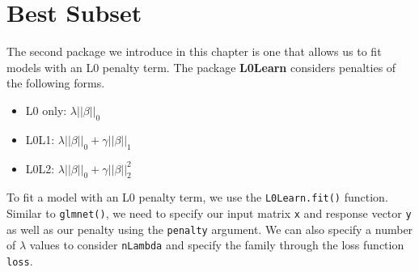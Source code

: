 \documentclass[
  letterpaper,
]{latex/krantz}
\makeatletter
\newenvironment{Shaded}{\begin{snugshade}}{\end{snugshade}}
\newcommand{\AttributeTok}[1]{\textcolor[rgb]{0.40,0.45,0.13}{#1}}
\newcommand{\CommentTok}[1]{\textcolor[rgb]{0.37,0.37,0.37}{#1}}
\newcommand{\DecValTok}[1]{\textcolor[rgb]{0.68,0.00,0.00}{#1}}
\newcommand{\FunctionTok}[1]{\textcolor[rgb]{0.28,0.35,0.67}{#1}}
\newcommand{\NormalTok}[1]{\textcolor[rgb]{0.00,0.23,0.31}{#1}}
\newcommand{\SpecialCharTok}[1]{\textcolor[rgb]{0.37,0.37,0.37}{#1}}
\newenvironment{kframe}{%
\medskip{}
\setlength{\fboxsep}{.8em}
 \def\at@end@of@kframe{}%
 \ifinner\ifhmode%
  \def\at@end@of@kframe{\end{minipage}}%
  \begin{minipage}{\columnwidth}%
 \fi\fi%
 \def\FrameCommand##1{\hskip\@totalleftmargin \hskip-\fboxsep
 \colorbox{shadecolor}{##1}\hskip-\fboxsep
     \hskip-\linewidth \hskip-\@totalleftmargin \hskip\columnwidth}%
 \MakeFramed {\advance\hsize-\width
   \@totalleftmargin\z@ \linewidth\hsize
   \@setminipage}}%
 {\par\unskip\endMakeFramed%
 \at@end@of@kframe}
\renewenvironment{Shaded}{\begin{kframe}}{\end{kframe}}
\makeatother
\begin{document}
\begin{Shaded}
\end{Shaded}

\section{\texorpdfstring{Best Subset
}{Best Subset }}\label{best-subset}

The second package we introduce in this chapter is one that allows us to
fit models with an L0 penalty term. The package \textbf{L0Learn}
 considers penalties of the following forms.

\begin{itemize}
\item
  L0 only: \(\lambda ||\beta||_0\)
\item
  L0L1: \(\lambda ||\beta ||_0 + \gamma ||\beta||_1\)
\item
  L0L2: \(\lambda ||\beta||_0 + \gamma ||\beta ||_2^2\)
\end{itemize}

To fit a model with an L0 penalty term, we use the
\texttt{L0Learn.fit()}
function. Similar to \texttt{glmnet()}, we need to specify our input
matrix \texttt{x} and response vector \texttt{y} as well as our penalty
using the \texttt{penalty} argument. We can also specify a number of
\(\lambda\) values to consider \texttt{nLambda} and specify the family
through the loss function \texttt{loss}.
\end{document}
